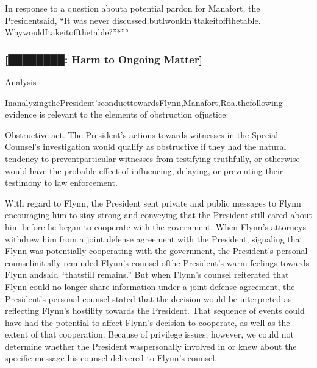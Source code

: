 In response to a question abouta potential pardon for Manafort, the Presidentsaid, “It was never discussed,butIwouldn’ttakeitoffthetable. WhywouldItakeitoffthetable?”*”°

\subsubsection{[████████: Harm to Ongoing Matter]}








Analysis

InanalyzingthePresident’sconducttowardsFlynn,Manafort,Roa.thefollowing evidence is relevant to the elements of obstruction ofjustice:

Obstructive act. The President’s actions towards witnesses in the Special Counsel’s investigation would qualify as obstructive if they had the natural tendency to preventparticular witnesses from testifying truthfully, or otherwise would have the probable effect of influencing, delaying, or preventing their testimony to law enforcement.

With regard to Flynn, the President sent private and public messages to Flynn encouraging him to stay strong and conveying that the President still cared about him before he began to cooperate with the government. When Flynn’s attorneys withdrew him from a joint defense agreement with the President, signaling that Flynn was potentially cooperating with the government, the President’s personal counselinitially reminded Flynn’s counsel ofthe President’s warm feelings towards Flynn andsaid “thatstill remains.” But when Flynn’s counsel reiterated that Flynn could no longer share information under a joint defense agreement, the President’s personal counsel stated that the decision would be interpreted as reflecting Flynn’s hostility towards the President. That sequence of events could have had the potential to affect Flynn’s decision to cooperate, as well as the extent of that cooperation. Because of privilege issues, however, we could not determine whether the President waspersonally involved in or knew about the specific message his counsel delivered to Flynn’s counsel.

